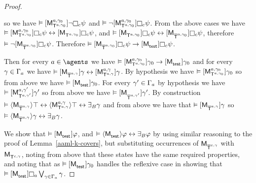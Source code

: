 \begin{proof}
\begin{enumerate}
\begin{description}
                so we have $\entails \actionA{\aPModel[\agentA, \gamma_0]{\aStatesT[\agentA, \gamma_0]}} \lnot \necessaryC \psi$ and
                $\entails \lnot \actionA{\aPModel[\agentA, \gamma_0]{\aStatesT[\agentA, \gamma_0]}} \necessaryC \psi$.
                From the above cases we have
                $\entails \actionA{\aPModel[\agentA, \gamma_0]{\aStatesT[\agentA, \gamma_0]}} \necessaryC \psi \iff \actionA{\aPModel{\aStatesT[\agentA, \gamma_0]}} \necessaryC \psi$, and
                $\entails \actionA{\aPModel{\aStatesT[\agentA, \gamma_0]}} \necessaryC \psi \iff \actionA{\aPModel{\aPStatesT[\agentA, \gamma_0]}} \necessaryC \psi$, 
                therefore $\entails \lnot \actionA{\aPModel{\aPStatesT[\agentA, \gamma_0]}} \necessaryC \psi$.
                Therefore $\entails \actionA{\aPModel{\aPStatesT[\agentA, \gamma_0]}} \necessaryC \psi \implies \actionA{\aPModel{\aStateTest}} \necessaryC \psi$.
        \end{description}
\end{enumerate}

Then for every $\agentA \in \agents$ we have $\entails \actionA{\aPModel[\agentA, \gamma_0]{\aStatesT[\agentA, \gamma_0]}} \gamma_0 \implies \actionA{\aPModel{\aStateTest}} \gamma_0$ and
for every $\gamma \in \Gamma_\agentA$ we have $\entails \actionA{\aPModel{\aPStatesT[\agentA, \gamma]}} \gamma \iff \actionA{\aPModel[\agentA, \gamma]{\aStatesT[\agentA, \gamma]}} \gamma$.
By hypothesis we have $\entails \actionA{\aPModel[\agentA, \gamma_0]{\aStatesT[\agentA, \gamma_0]}} \gamma_0$ so from above we have $\entails \actionA{\aPModel{\aStateTest}} \gamma_0$.
For every $\gamma' \in \Gamma_\agentA$ by hypothesis we have $\entails \actionA{\aPModel[\agentA, \gamma']{\aStatesT[\agentA, \gamma']}} \gamma'$ so from above we have $\entails \actionA{\aPModel{\aPStatesT[\agentA, \gamma']}} \gamma'$.
By construction $\entails \actionE{\aPModel{\aPStatesT[\agentA, \gamma]}} \top \iff \actionE{\aPModel[\agentA, \gamma]{\aStatesT[\agentA, \gamma]}} \top \iff \someactsBs \gamma$ and
from above we have that $\entails \actionA{\aPModel{\aPStatesT[\agentA, \gamma]}} \gamma$
so $\entails \actionE{\aPModel{\aPStatesT[\agentA, \gamma]}} \gamma \iff \someactsBs \gamma$.

We show that
$\entails \actionA{\aPModel{\aStateTest}} \phi$, and 
$\entails \actionE{\aPModel{\aStateTest}} \phi \iff \someactsBs \phi$
by using similar reasoning to the proof of Lemma~\ref{aaml-k-covers},
but substituting occurrences of $\aPModel{\aPStatesT[\agentC, \gamma]}$ with $\aPModel{\aStatesT[\agentC, \gamma]}$, noting from above that these states have the same required properties, and noting that as $\entails \actionA{\aPModel{\aStateTest}} \gamma_0$ handles the reflexive case in showing that $\entails \actionA{\aPModel{\aStateTest}} \necessaryA \bigvee_{\gamma \in \Gamma_\agentA} \gamma$.


\end{proof}

